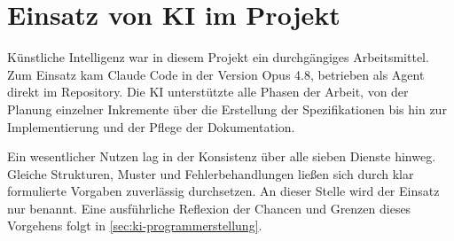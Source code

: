 \section{Einsatz von KI im Projekt}
\label{sec:ki-einsatz}

Künstliche Intelligenz war in diesem Projekt ein durchgängiges Arbeitsmittel. Zum Einsatz kam Claude Code in der Version Opus 4.8, betrieben als Agent direkt im Repository. Die KI unterstützte alle Phasen der Arbeit, von der Planung einzelner Inkremente über die Erstellung der Spezifikationen bis hin zur Implementierung und der Pflege der Dokumentation.

Ein wesentlicher Nutzen lag in der Konsistenz über alle sieben Dienste hinweg. Gleiche Strukturen, Muster und Fehlerbehandlungen ließen sich durch klar formulierte Vorgaben zuverlässig durchsetzen. An dieser Stelle wird der Einsatz nur benannt. Eine ausführliche Reflexion der Chancen und Grenzen dieses Vorgehens folgt in \vref{sec:ki-programmerstellung}.

